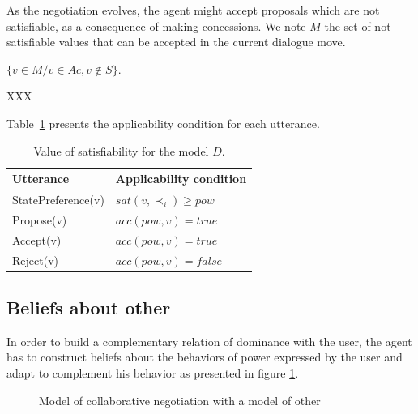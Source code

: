\documentclass[conference, letterpaper]{IEEEtran}
\begin{document}
As the negotiation evolves, the agent might accept proposals which are not satisfiable, as a consequence of making concessions. We note $M$ the set of not-satisfiable values that can be accepted in the current dialogue move.

$\{v \in M / v \in Ac, v \notin S\}$.

%	



XXX

Table~\ref{tab:utt} presents the applicability condition for each utterance.

\begin{table}
	\centering
	\begin{tabular}  {|l|l|}
		\hline
		Utterance & Applicability condition \\
		\hline
		StatePreference(v) & $sat(v, \prec_i) \geq pow$ \\
		\hline 
		Propose(v) & $acc(pow, v) = true$ \\
		\hline
		Accept(v)  & $acc(pow, v) = true$ \\
		\hline
		Reject(v) & $acc(pow, v) = false$ \\
		\hline
	\end{tabular}
	\caption{Value of satisfiability for the model $D$.}
	\label{tab:utt}
\end{table}

\subsection{Beliefs about other}

In order to build a complementary relation of dominance with the user, the agent has to construct beliefs about the behaviors of power expressed by the user and adapt to complement his behavior as presented in figure \ref{fig:model}.

\begin{figure}
	\caption{Model of collaborative negotiation with a model of other} 
	\label{fig:model}
\end{figure} 
\end{document}
